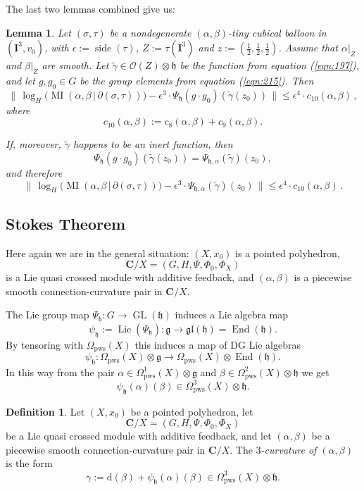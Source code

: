 \documentclass[10pt, a4paper]{amsart}
\newtheorem{lem}[equation]{Lemma}
\theoremstyle{definition}
\newtheorem{dfn}[equation]{Definition}
\numberwithin{equation}{section}
\newcommand{\opn}{\operatorname}
\newcommand{\mfrak}[1]{\mathfrak{#1}}
\newcommand{\mcal}[1]{\mathcal{#1}}
\newcommand{\mbf}[1]{\mathbf{#1}}
\newcommand{\mrm}[1]{\mathrm{#1}}
\newcommand{\smfrac}[2]{{\textstyle \frac{#1}{#2}}}
\newcommand{\tup}[1]{\textup{#1}}
\newcommand{\til}[1]{\tilde{#1}}
\newcommand{\Norm}[1]{\bigl\lVert\, #1 \, \bigr\rVert}
\renewcommand{\vert}{\, | \,}
\newcommand{\g}{\mfrak{g}}
\newcommand{\h}{\mfrak{h}}
\renewcommand{\d}{\mrm{d}}
\begin{document}
The last two lemmas combined give us:

\begin{lem} \label{lem:49}
Let $(\sigma, \tau)$ be a nondegenerate $(\alpha, \beta)$-tiny 
cubical balloon in $(\mbf{I}^3, v_0)$, with 
$\epsilon := \opn{side}(\tau)$,
$Z := \tau(\mbf{I}^3)$ and 
$z := (\smfrac{1}{2}, \smfrac{1}{2}, \smfrac{1}{2})$. 
Assume that $\alpha|_Z$ and $\beta|_Z$ are smooth. Let
$\til{\gamma} \in \mcal{O}(Z) \otimes \h$ be the function from 
equation \tup{(\ref{eqn:197})}, and let $g, g_0 \in G$ be the group elements
from equation \tup{(\ref{eqn:215})}. Then
\[ \Norm{ \log_H \bigl( \opn{MI}(\alpha, \beta \vert 
\partial(\sigma, \tau)) \bigr) 
- \epsilon^3 \cdot \Psi_{\h}(g \cdot g_0)(\til{\gamma}(z_0)) } 
\leq \epsilon^4 \cdot c_{10}(\alpha, \beta) \, , \]
where
\[ c_{10}(\alpha, \beta) := c_8(\alpha, \beta) + c_9(\alpha, \beta) . \]

If, moreover, $\til{\gamma}$ happens to be an inert function, then 
\[ \Psi_{\h}(g \cdot g_0) (\til{\gamma}(z_0)) = 
\Psi_{\h, \alpha}(\til{\gamma})(z_0) , \]
and therefore
\[ \Norm{ \log_H \bigl( \opn{MI}(\alpha, \beta \vert 
\partial(\sigma, \tau)) \bigr) 
- \epsilon^3 \cdot \Psi_{\h, \alpha}(\til{\gamma})(z_0) } 
\leq \epsilon^4 \cdot c_{10}(\alpha, \beta) \, . \]
\end{lem}


\subsection{Stokes Theorem}

Here again we are in the general situation: 
$(X, x_0)$ is a pointed polyhedron, 
\[ \mbf{C} / X = (G, H, \Psi, \Phi_0, \Phi_X) \]
is a Lie quasi crossed module with additive feedback, and
$(\alpha, \beta)$ is a piecewise smooth connection-curvature pair in 
$\mbf{C} / X$.

The Lie group map
$\Psi_{\h} : G \to \opn{GL}(\h)$ induces a Lie algebra map
\[ \psi_{\h} := \opn{Lie}(\Psi_{\h}) : \g \to \mfrak{gl}(\h) = 
\opn{End}(\h) . \]
By tensoring with $\Omega_{\mrm{pws}}(X)$ this induces a map of DG Lie algebras
\[ \psi_{\h} : \Omega_{\mrm{pws}}(X) \otimes \g \to 
\Omega_{\mrm{pws}}(X) \otimes \opn{End}(\h) . \]
In this way from the pair $\alpha \in \Omega^1_{\mrm{pws}}(X) \otimes \g$
and 
$\beta \in \Omega^2_{\mrm{pws}}(X) \otimes \h$ we get
\[ \psi_{\h}(\alpha)(\beta) \in \Omega^3_{\mrm{pws}}(X) \otimes \h . \]

\begin{dfn} \label{dfn:32}
Let $(X, x_0)$ be a pointed polyhedron, let
\[ \mbf{C} / X = (G, H, \Psi, \Phi_0, \Phi_X) \]
be a Lie quasi crossed module with additive feedback, and
let $(\alpha, \beta)$ be a piecewise smooth connection-curvature pair in 
$\mbf{C} / X$. The {\em $3$-curvature of $(\alpha, \beta)$} is the form
\[ \gamma := \d(\beta) + \psi_{\h}(\alpha)(\beta) \in 
\Omega_{\mrm{pws}}^3(X) \otimes \h . \]
\end{dfn}
\end{document}
